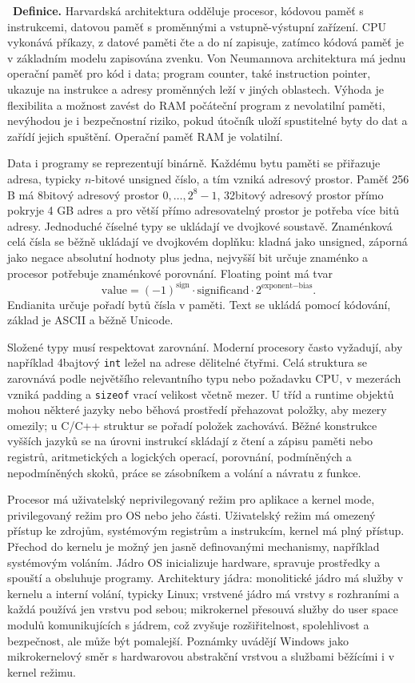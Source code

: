 \begin{odpoved}
\setlength{\parskip}{2pt}
\noindent{}\ \textbf{Definice.}
Harvardská architektura odděluje procesor, kódovou paměť s instrukcemi, datovou paměť s
proměnnými a vstupně-výstupní zařízení. CPU vykonává příkazy, z datové paměti čte a do
ní zapisuje, zatímco kódová paměť je v základním modelu zapisována zvenku. Von Neumannova
architektura má jednu operační paměť pro kód i data; program counter, také instruction
pointer, ukazuje na instrukce a adresy proměnných leží v jiných oblastech. Výhoda je
flexibilita a možnost zavést do RAM počáteční program z nevolatilní paměti, nevýhodou je
i bezpečnostní riziko, pokud útočník uloží spustitelné byty do dat a zařídí jejich
spuštění. Operační paměť RAM je volatilní.

Data i programy se reprezentují binárně. Každému bytu paměti se přiřazuje adresa,
typicky $n$-bitové unsigned číslo, a tím vzniká adresový prostor. Paměť 256 B má
8bitový adresový prostor $0,\ldots,2^8-1$, 32bitový adresový prostor přímo pokryje 4 GB adres a pro
větší přímo adresovatelný prostor je potřeba více bitů adresy. Jednoduché číselné typy se ukládají ve dvojkové soustavě.
Znaménková celá čísla se běžně ukládají ve dvojkovém doplňku: kladná jako unsigned,
záporná jako negace absolutní hodnoty plus jedna, nejvyšší bit určuje znaménko a
procesor potřebuje znaménkové porovnání. Floating point má tvar
\[
\text{value}=(-1)^{\text{sign}}\cdot\text{significand}\cdot
2^{\text{exponent}-\text{bias}}.
\]
Endianita určuje pořadí bytů čísla v paměti. Text se ukládá pomocí kódování, základ je
ASCII a běžně Unicode.

Složené typy musí respektovat zarovnání. Moderní procesory často vyžadují, aby například
4bajtový \texttt{int} ležel na adrese dělitelné čtyřmi. Celá struktura se zarovnává
podle největšího relevantního typu nebo požadavku CPU, v mezerách vzniká padding a
\texttt{sizeof} vrací velikost včetně mezer. U tříd a runtime objektů mohou některé jazyky nebo běhová prostředí
přehazovat položky, aby mezery omezily; u C/C++ struktur se pořadí položek zachovává. Běžné konstrukce vyšších jazyků se na
úrovni instrukcí skládají z čtení a zápisu paměti nebo registrů, aritmetických a
logických operací, porovnání, podmíněných a nepodmíněných skoků, práce se zásobníkem a
volání a návratu z funkce.

Procesor má uživatelský neprivilegovaný režim pro aplikace a kernel mode, privilegovaný
režim pro OS nebo jeho části. Uživatelský režim má omezený přístup ke zdrojům,
systémovým registrům a instrukcím, kernel má plný přístup. Přechod do kernelu je možný
jen jasně definovanými mechanismy, například systémovým voláním. Jádro OS inicializuje
hardware, spravuje prostředky a spouští a obsluhuje programy. Architektury jádra:
monolitické jádro má služby v kernelu a interní volání, typicky Linux; vrstvené jádro
má vrstvy s rozhraními a každá používá jen vrstvu pod sebou; mikrokernel přesouvá služby
do user space modulů komunikujících s jádrem, což zvyšuje rozšiřitelnost, spolehlivost a
bezpečnost, ale může být pomalejší. Poznámky uvádějí Windows jako mikrokernelový směr s
hardwarovou abstrakční vrstvou a službami běžícími i v kernel režimu.


\end{odpoved}
